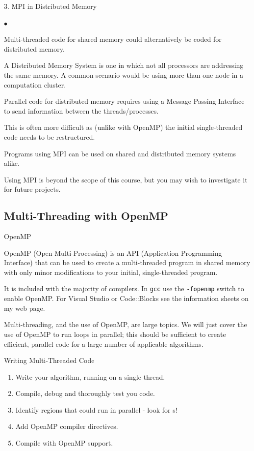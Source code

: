 \documentclass[smaller,handout,table]{beamer}
\begin{document}
\begin{frame}{3. MPI in Distributed Memory}
\begin{list}{$\bullet$}{}
\item Multi-threaded code for shared memory could alternatively be coded for distributed memory.
\item A Distributed Memory System is one in which not all processors are addressing the same memory. A common scenario would be using more than one node in a computation cluster.
\item Parallel code for distributed memory requires using a Message Passing Interface to send information between the threads/processes.
\item This is often more difficult as (unlike with OpenMP) the initial single-threaded code needs to be restructured.
\item Programs using MPI can be used on shared and distributed memory systems alike.
\item Using MPI is beyond the scope of this course, but you may wish to investigate it for future projects.
\end{list}
\end{frame}

\subsection{Multi-Threading with OpenMP}
\begin{frame}{OpenMP}
\begin{block}{}
OpenMP (Open Multi-Processing) is an API (Application Programming Interface) that can be used to create a multi-threaded program in shared memory with only minor modifications to your initial, single-threaded program.
\end{block}
\begin{block}{}
It is included with the majority of compilers. In \texttt{gcc} use the \texttt{-fopenmp} switch to enable OpenMP. For Visual Studio or Code::Blocks see the information sheets on my web page.
\end{block}
\begin{block}{}
Multi-threading, and the use of OpenMP, are large topics. We will just cover the use of OpenMP to run \texttt{} loops in parallel; this should be sufficient to create efficient, parallel code for a large number of applicable algorithms.
\end{block}
\end{frame}

\begin{frame}{Writing Multi-Threaded Code}
\begin{enumerate}
\item Write your algorithm, running on a single thread.
\item Compile, debug and thoroughly test you code.
\item Identify regions that could run in parallel - look for \texttt{}s!
\item Add OpenMP compiler directives.
\item Compile with OpenMP support.
\end{enumerate}
\end{frame}
\end{document}
